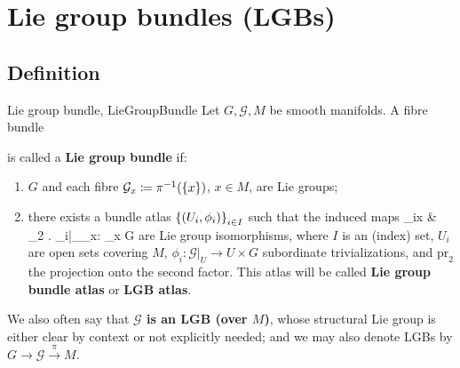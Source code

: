 \documentclass[a4paper,oneside,11pt,bibliography=totoc]{scrartcl}
\def\bas#1\eas{\begin{align*}#1\end{align*}}
\theoremstyle{plain}
\theoremstyle{remark}
\theoremstyle{definition}
\begin{document}
\section{Lie group bundles (LGBs)}

\subsection{Definition}
\begin{definitions}{Lie group bundle, \cite[\S 1.1, Def.\ 1.1.19; p. 11]{mackenzieGeneralTheory}}{LieGroupBundle}
Let $G, \mathcal{G}, M$ be smooth manifolds. A fibre bundle
\begin{center}
\end{center}
is called a \textbf{Lie group bundle} if:
\begin{enumerate}
	\item $G$ and each fibre $\mathcal{G}_x \coloneqq \pi^{-1}\mleft( \{x\} \mright)$, $x\in M$, are Lie groups;
	\item there exists a bundle atlas $\mleft\{ \mleft( U_i, \phi_i \mright) \mright\}_{i \in I}$ such that the induced maps
	\bas
	\phi_{ix}
	&\coloneqq
	_2 \circ \mleft. \phi_i\mright|_{_x}: _x \to G
	\eas
	are Lie group isomorphisms, where $I$ is an (index) set, $U_i$ are open sets covering $M$, $\phi_i: \mathcal{G}|_U \to U \times G$ subordinate trivializations, and $\mathrm{pr}_2$ the projection onto the second factor. This atlas will be called \textbf{Lie group bundle atlas} or \textbf{LGB atlas}.
\end{enumerate}

We also often say that \textbf{$\mathcal{G}$ is an LGB (over $M$)}, whose structural Lie group is either clear by context or not explicitly needed; and we may also denote LGBs by $G \to \mathcal{G} \stackrel{\pi}{\to} M$.
\end{definitions}
\end{document}

